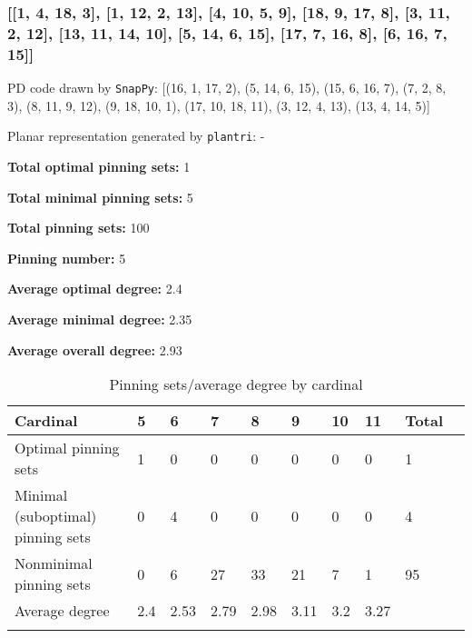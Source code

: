 \documentclass{article}%
\begin{document}
\newpage

\subsubsection{[[1, 4, 18, 3], [1, 12, 2, 13], [4, 10, 5, 9], [18, 9, 17, 8], [3, 11, 2, 12], [13, 11, 14, 10], [5, 14, 6, 15], [17, 7, 16, 8], [6, 16, 7, 15]]}

{\small\noindent PD code drawn by \texttt{SnapPy}: [(16, 1, 17, 2), (5, 14, 6, 15), (15, 6, 16, 7), (7, 2, 8, 3), (8, 11, 9, 12), (9, 18, 10, 1), (17, 10, 18, 11), (3, 12, 4, 13), (13, 4, 14, 5)]}

{\small\noindent Planar representation generated by \texttt{plantri}: -}

\begin{multicols}{2}
{\normalsize \noindent\textbf{Total optimal pinning sets:} 1

\noindent\textbf{Total minimal pinning sets:} 5

\noindent\textbf{Total pinning sets:} 100

\noindent\textbf{Pinning number:} 5

}
\columnbreak

{\normalsize \noindent\textbf{Average optimal degree:} 2.4

\noindent\textbf{Average minimal degree:} 2.35

\noindent\textbf{Average overall degree:} 2.93

}
\end{multicols}

\begin{table}[ht]
	\caption{Pinning sets/average degree by cardinal}
	\centering
	\renewcommand{\arraystretch}{1.5}
	\begin{tabularx}{\textwidth}{lXXXXXXXXX}
		\toprule
			Cardinal & 5 & 6 & 7 & 8 & 9 & 10 & 11 & Total\\
			\hline
			Optimal pinning sets & 1 & 0 & 0 & 0 & 0 & 0 & 0 & 1 \\
			Minimal (suboptimal) pinning sets & 0 & 4 & 0 & 0 & 0 & 0 & 0 & 4 \\
			Nonminimal pinning sets & 0 & 6 & 27 & 33 & 21 & 7 & 1 & 95 \\
			Average degree & 2.4 & 2.53 & 2.79 & 2.98 & 3.11 & 3.2 & 3.27 &  \\
		\bottomrule \\ 
	\end{tabularx}
\end{table}
\end{document}
